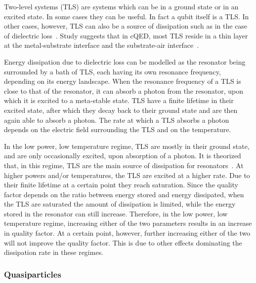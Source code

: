       Two-level systems (TLS) are systems which can be in a ground state or in an excited state. In some cases they can be useful. In fact a qubit itself is a TLS. In other cases, however, TLS can also be a source of dissipation such as in the case of dielectric loss~\cite{martinis2014ucsb}. Study suggests that in cQED, most TLS reside in a thin layer at the metal-substrate interface and the substrate-air interface~\cite{wenner2011surface}.

      Energy dissipation due to dielectric loss can be modelled as the resonator being surrounded by a bath of TLS, each having its own resonance frequency, depending on its energy landscape. When the resonance frequency of a TLS is close to that of the resonator, it can absorb a photon from the resonator, upon which it is excited to a meta-stable state. TLS have a finite lifetime in their excited state, after which they decay back to their ground state and are then again able to absorb a photon. The rate at which a TLS absorbs a photon depends on the electric field surrounding the TLS and on the temperature.

      In the low power, low temperature regime, TLS are mostly in their ground state, and are only occasionally excited, upon absorption of a photon. It is theorized that, in this regime, TLS are the main source of dissipation for resonators~\cite{gao2008experimental}. At higher powers and/or temperatures, the TLS are excited at a higher rate. Due to their finite lifetime at a certain point they reach saturation. Since the quality factor depends on the ratio between energy stored and energy dissipated, when the TLS are saturated the amount of dissipation is limited, while the energy stored in the resonator can still increase. Therefore, in the low power, low temperature regime, increasing either of the two parameters results in an increase in quality factor. At a certain point, however, further increasing either of the two will not improve the quality factor. This is due to other effects dominating the dissipation rate in these regimes.




    \subsubsection{Quasiparticles}

